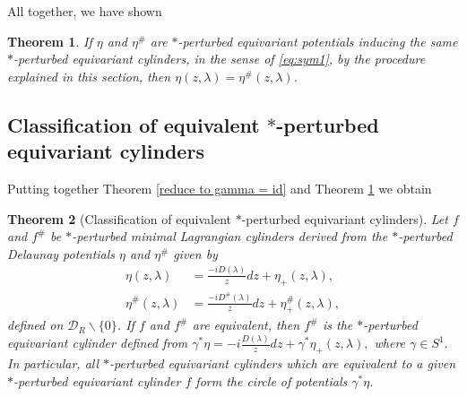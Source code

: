 \documentclass[a4paper,11pt]{amsart}
\newtheorem{theorem}{Theorem}[section]
\theoremstyle{definition}
\numberwithin{equation}{section}
\begin{document}
All together, we have shown
\begin{theorem} \label{classification if gamma = id}
If $\eta$ and $\eta^{\#}$ are $*$-perturbed equivariant potentials inducing the same $*$-perturbed equivariant cylinders, in the sense of \eqref{eq:sym1}, by the procedure explained
in this section, then $\eta(z,\lambda)=\eta^{\#}(z,\lambda)$. 
\end{theorem}

\subsection{Classification of equivalent  $*$-perturbed equivariant cylinders}

Putting together Theorem \ref{reduce to gamma = id} and Theorem \ref{classification if gamma = id} we obtain

\begin{theorem} [Classification of equivalent  $*$-perturbed equivariant cylinders]
Let $f$ and $f^{\#}$ be  $*$-perturbed minimal Lagrangian cylinders derived from the 
 $*$-perturbed Delaunay potentials    $\eta$ and $\eta^{\#}$ given by
\begin{equation}
\begin{aligned}
\eta(z,\lambda)&=\frac{-iD(\lambda)}{z}dz+\eta_+(z,\lambda),\\
\eta^{\#}(z,\lambda)&=\frac{-iD^{\#}(\lambda)}{z} dz+\eta_+^{\#}(z,\lambda),
\end{aligned} 
\end{equation}
defined on $\mathcal{D}_R\backslash\{0\}$.
\newline If $f$ and $f^{\#}$ are equivalent, then $f^{\#}$ is the  $*$-perturbed equivariant cylinder defined 
from $\gamma^* \eta =  -i\frac{D(\lambda)}{z}dz+\gamma^*\eta_{+}(z,\lambda),$ where $\gamma \in S^1.$
\newline In particular, all  $*$-perturbed equivariant cylinders which are equivalent to a given  $*$-perturbed equivariant cylinder $f$ form the circle of potentials $\gamma^*\eta$.
\end{theorem}
\end{document}
